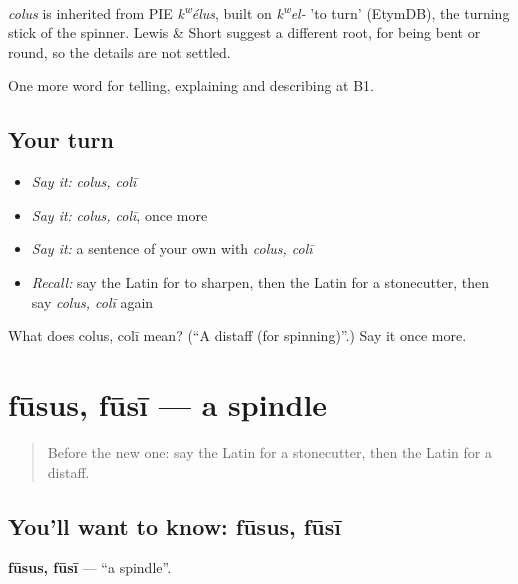 \begin{cousinweb}
\emph{colus} is inherited from PIE \emph{k\textsuperscript{w}élus}, built on \emph{k\textsuperscript{w}el-} 'to turn' (EtymDB), the turning stick of the spinner. Lewis \& Short suggest a different root, for being bent or round, so the details are not settled.
\end{cousinweb}

\begin{grammarlens}[title={What you've built}]
One more word for telling, explaining and describing at B1.
\end{grammarlens}

\subsection*{Your turn}
\begin{itemize}
\raggedright
  \item \emph{Say it:} \emph{colus, colī}
  \item \emph{Say it:} \emph{colus, colī}, once more
  \item \emph{Say it:} a sentence of your own with \emph{colus, colī}
  \item \emph{Recall:} say the Latin for to sharpen, then the Latin for a stonecutter, then say \emph{colus, colī} again
\end{itemize}

\begin{tcolorbox}[breakable,colback=teal!4,colframe=teal!35!black,title={Before you move on}]
What does colus, colī mean? (\textquotedblleft{}A distaff (for spinning)\textquotedblright{}.) Say it once more.
\end{tcolorbox}
\section[fūsus, fūsī]{fūsus, fūsī — a spindle}

\label{lesson:LA-C472-fusus}



\begin{quote}
Before the new one: say the Latin for a stonecutter, then the Latin for a distaff.
\end{quote}

\subsection*{You'll want to know: fūsus, fūsī}
\textbf{fūsus, fūsī} — \textquotedblleft{}a spindle\textquotedblright{}.

